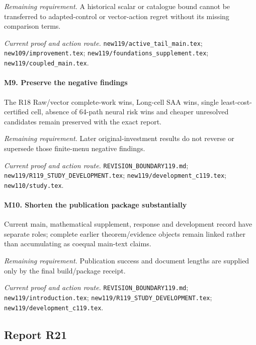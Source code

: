\par\emph{Remaining requirement.} A historical scalar or catalogue bound cannot be transferred to adapted-control or vector-action regret without its missing comparison terms.

\par\emph{Current proof and action route.} \nolinkurl{new119/active_tail_main.tex}; \nolinkurl{new109/improvement.tex}; \nolinkurl{new119/foundations_supplement.tex}; \nolinkurl{new119/coupled_main.tex}.

\paragraph{M9. Preserve the negative findings}

The R18 Raw/\allowbreak{}vector complete-work wins, Long-cell SAA wins, single least-cost-certified cell, absence of 64-path neural risk wins and cheaper unresolved candidates remain preserved with the exact report.

\par\emph{Remaining requirement.} Later original-investment results do not reverse or supersede those finite-menu negative findings.

\par\emph{Current proof and action route.} \nolinkurl{REVISION_BOUNDARY119.md}; \nolinkurl{new119/R119_STUDY_DEVELOPMENT.tex}; \nolinkurl{new119/development_c119.tex}; \nolinkurl{new110/study.tex}.

\paragraph{M10. Shorten the publication package substantially}

Current main, mathematical supplement, response and development record have separate roles; complete earlier theorem/\allowbreak{}evidence objects remain linked rather than accumulating as coequal main-text claims.

\par\emph{Remaining requirement.} Publication success and document lengths are supplied only by the final build/\allowbreak{}package receipt.

\par\emph{Current proof and action route.} \nolinkurl{REVISION_BOUNDARY119.md}; \nolinkurl{new119/introduction.tex}; \nolinkurl{new119/R119_STUDY_DEVELOPMENT.tex}; \nolinkurl{new119/development_c119.tex}.

\subsection{Report R21}

